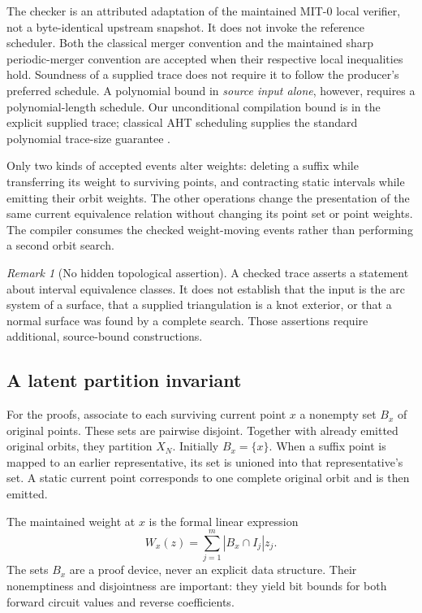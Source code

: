 \documentclass[11pt]{article}
\theoremstyle{definition}\newtheorem{definition}[theorem]{Definition}
\theoremstyle{remark}\newtheorem{remark}[theorem]{Remark}
\begin{document}
The checker is an attributed adaptation of the maintained MIT-0 local verifier,
not a byte-identical upstream snapshot. It does not invoke the reference
scheduler. Both the classical merger convention and the maintained sharp
periodic-merger convention are accepted when their respective local inequalities
hold. Soundness of a supplied trace does not require it to follow the producer's
preferred schedule. A polynomial bound in \emph{source input alone}, however,
requires a polynomial-length schedule. Our unconditional compilation bound is
in the explicit supplied trace; classical AHT scheduling supplies the standard
polynomial trace-size guarantee \cite{aht}.

Only two kinds of accepted events alter weights: deleting a suffix while
transferring its weight to surviving points, and contracting static intervals
while emitting their orbit weights. The other operations change the presentation
of the same current equivalence relation without changing its point set or
point weights. The compiler consumes the checked weight-moving events rather
than performing a second orbit search.

\begin{remark}[No hidden topological assertion]
A checked trace asserts a statement about interval equivalence classes. It does
not establish that the input is the arc system of a surface, that a supplied
triangulation is a knot exterior, or that a normal surface was found by a complete
search. Those assertions require additional, source-bound constructions.
\end{remark}

\subsection{A latent partition invariant}
For the proofs, associate to each surviving current point $x$ a nonempty set
$B_x$ of original points. These sets are pairwise disjoint. Together with already
emitted original orbits, they partition $X_N$. Initially $B_x=\{x\}$. When a
suffix point is mapped to an earlier representative, its set is unioned into
that representative's set. A static current point corresponds to one complete
original orbit and is then emitted.

The maintained weight at $x$ is the formal linear expression
\[
 W_x(z)=\sum_{j=1}^m |B_x\cap I_j|z_j.
\]
The sets $B_x$ are a proof device, never an explicit data structure. Their
nonemptiness and disjointness are important: they yield bit bounds for both
forward circuit values and reverse coefficients.
\end{document}
